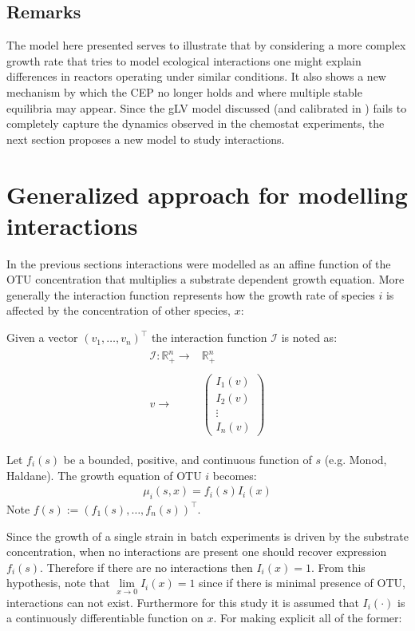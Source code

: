\documentclass[3p,times]{article}
\newcommand{\R}{\mathbb{R}}
\newcommand{\I}{\mathcal{I}}
\begin{document}
\subsection{Remarks}

The model here presented serves to illustrate that by considering a more complex growth rate that tries to model ecological interactions one might explain differences in reactors operating under similar conditions. It also shows a new mechanism by which the CEP no longer holds and where multiple stable equilibria may appear. Since the gLV model discussed (and calibrated in \cite{Dumont2016}) fails to completely capture the dynamics observed in the chemostat experiments, the next section proposes a new model to study interactions.


\section{Generalized approach for modelling interactions}
In the previous sections interactions were modelled as an affine function of the OTU concentration that multiplies a substrate dependent growth equation. More generally the interaction function represents how the growth rate of species $i$ is affected by the concentration of other species, $x$: 

Given a vector $(v_1,\dots,v_n)^\top$ the interaction function $\I$ is noted as:
\begin{align}
\begin{array}{rc}
\I: \R_+^n \rightarrow & \R_+^n\\
& \\
v \rightarrow & \begin{pmatrix}
I_1(v) \\
I_2(v) \\ 
\vdots  \\
I_n(v)
\end{pmatrix}
\end{array}
\end{align}

Let $f_i(s)$ be a bounded, positive, and continuous function of $s$ (e.g. Monod, Haldane). The growth equation of OTU $i$ becomes:
\begin{align}
	\mu_i(s,x) = f_i(s)I_i(x)
\end{align}
Note $f(s) := (f_1(s),\dots,f_n(s))^\top$.
	\label{growthForm}

Since the growth of a single strain in batch experiments is driven by the substrate concentration, when no interactions are present one should recover expression $f_i(s)$. Therefore if there are no interactions then $I_i(x) = 1$. From this hypothesis, note that $ \lim \limits_{x \rightarrow 0} I_i(x) = 1$ since if there is minimal presence of OTU, interactions can not exist. Furthermore for this study it is assumed that $I_i(\cdot)$ is a continuously differentiable function on $x$. For making explicit all of the former:
\end{document}

